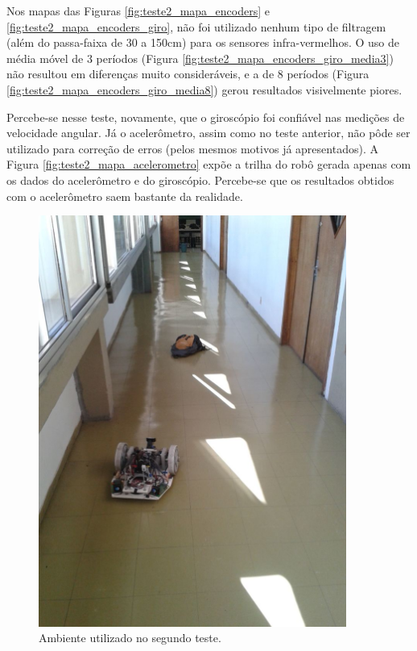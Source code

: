 Nos mapas das Figuras \ref{fig:teste2_mapa_encoders} e \ref{fig:teste2_mapa_encoders_giro}, não foi utilizado nenhum tipo de filtragem (além do passa-faixa de 30 a 150cm) para os sensores infra-vermelhos. O uso de média móvel de 3 períodos (Figura \ref{fig:teste2_mapa_encoders_giro_media3}) não resultou em diferenças muito consideráveis, e a de 8 períodos (Figura \ref{fig:teste2_mapa_encoders_giro_media8}) gerou resultados visivelmente piores.

Percebe-se nesse teste, novamente, que o giroscópio foi confiável nas medições de velocidade angular. Já o acelerômetro, assim como no teste anterior, não pôde ser utilizado para correção de erros (pelos mesmos motivos já apresentados). A Figura \ref{fig:teste2_mapa_acelerometro} expõe a trilha do robô gerada apenas com os dados do acelerômetro e do giroscópio. Percebe-se que os resultados obtidos com o acelerômetro saem bastante da realidade.

\begin{figure}[H]
	\centering
	\includegraphics[width=0.9\textwidth]{./figuras/testes/teste2/foto_ambiente.jpg}
	\caption{Ambiente utilizado no segundo teste.}
	\label{fig:teste2_foto}
\end{figure}

